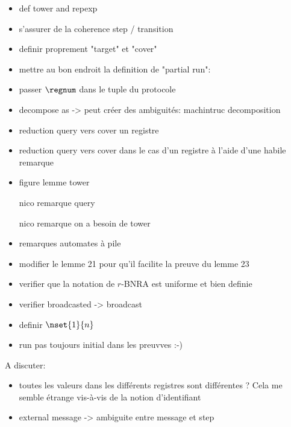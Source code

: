 \begin{itemize}
\item def tower and repexp
\item s'assurer de la coherence step / transition
\item definir proprement "target" et "cover"
\item mettre au bon endroit la definition de "partial run": 
    \item passer $\regnum$ dans le tuple du protocole
    \item decompose as -> peut créer des ambiguités: machintruc decomposition 
    \item reduction query vers cover un registre
    \item reduction query vers cover dans le cas d'un registre à l'aide d'une habile remarque
    \item figure lemme tower
    \item[nico] remarque query 
    \item[nico] remarque on a besoin de tower
    \item remarques automates à pile
    \item modifier le lemme 21 pour qu'il facilite la preuve du lemme 23
    \item verifier que la notation de $r$-BNRA est uniforme et bien definie
    \item  verifier broadcasted -> broadcast
    \item definir $\nset{1}{n}$
    \item run pas toujours initial dans les preuvves :-)
\end{itemize}

A discuter:
\begin{itemize}
\item toutes les valeurs dans les différents registres sont différentes ? Cela me semble étrange vis-à-vis de la notion d'identifiant
\item external message -> ambiguite entre message et step 
\end{itemize}